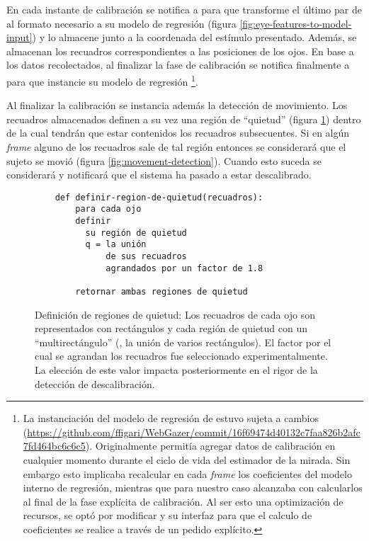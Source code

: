   En cada instante de calibración se notifica a \webgazer para que transforme
  el último par de \features al formato necesario a su modelo de regresión
  (figura \ref{fig:eye-features-to-model-input}) y lo almacene junto a la
  coordenada del estímulo presentado.
  Además, se almacenan los recuadros correspondientes a las posiciones de los
  ojos.
  En base a los datos recolectados, al finalizar la fase de calibración se
  notifica finalmente a \webgazer para que instancie su modelo de regresión
  \footnote{
    La instanciación del modelo de regresión de \webgazer estuvo sujeta a
    cambios
    (\url{https://github.com/ffigari/WebGazer/commit/16f69474d40132c7faa826b2afc7fd464bc6c6c5}).
    Originalmente \webgazer permitía agregar datos de calibración en cualquier
    momento durante el ciclo de vida del estimador de la mirada.
    Sin embargo esto implicaba recalcular en cada \textit{frame} los
    coeficientes del modelo interno de regresión, mientras que para nuestro
    caso alcanzaba con calcularlos al final de la fase explícita de
    calibración.
    Al ser esto una optimización de recursos, se optó por modificar \webgazer y
    su interfaz para que el calculo de coeficientes se realice a través de un
    pedido explícito.
  }.

  Al finalizar la calibración se instancia además la detección de movimiento.
  Los recuadros almacenados definen a su vez una región de ``quietud'' (figura
  \ref{fig:features-to-stillness-region}) dentro de la cual tendrán que estar
  contenidos los recuadros subsecuentes.
  Si en algún \textit{frame} alguno de los recuadros sale de tal región
  entonces se considerará que el sujeto se movió (figura
  \ref{fig:movement-detection}).
  Cuando esto suceda se considerará y notificará que el sistema ha pasado a 
  estar descalibrado.

  \begin{figure}
    \begin{verbatim}
    def definir-region-de-quietud(recuadros):
        para cada ojo
        definir
          su región de quietud
          q = la unión
              de sus recuadros
              agrandados por un factor de 1.8

        retornar ambas regiones de quietud\end{verbatim}
    
    \caption{Definición de regiones de quietud: Los recuadros de cada ojo son representados con rectángulos y cada
    región de quietud con un ``multirectángulo'' (\ie, la unión de varios
    rectángulos).
    El factor por el cual se agrandan los recuadros fue seleccionado experimentalmente.
    La elección de este valor impacta posteriormente en el rigor de
    la detección de descalibración.}
    \label{fig:features-to-stillness-region}
  \end{figure}

